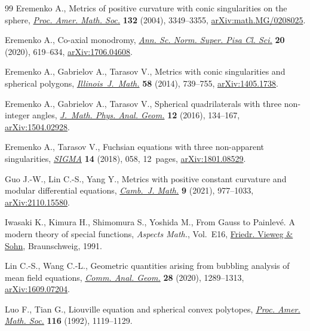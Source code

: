 \documentclass[pdftex]{sigma}
\numberwithin{equation}{section}
\begin{document}
\begin{thebibliography}{99}
Eremenko A., Metrics of positive curvature with conic singularities on the
 sphere, \href{https://doi.org/10.1090/S0002-9939-04-07439-8}{\textit{Proc. Amer. Math. Soc.}} \textbf{132} (2004), 3349--3355,
 \href{https://arxiv.org/abs/math.MG/0208025}{arXiv:math.MG/0208025}.

Eremenko A., Co-axial monodromy, \href{https://doi.org/10.2422/2036-2145.201706_022}{\textit{Ann. Sc. Norm. Super. Pisa Cl. Sci.}}
 \textbf{20} (2020), 619--634, \href{https://arxiv.org/abs/1706.04608}{arXiv:1706.04608}.

Eremenko A., Gabrielov A., Tarasov V., Metrics with conic singularities and
 spherical polygons, \href{https://doi.org/10.1215/ijm/1441790388}{\textit{Illinois~J.~Math.}} \textbf{58} (2014), 739--755,
 \href{https://arxiv.org/abs/1405.1738}{arXiv:1405.1738}.

Eremenko A., Gabrielov A., Tarasov V., Spherical quadrilaterals with three
 non-integer angles, \href{https://doi.org/10.15407/mag12.02.134}{\textit{J.~Math. Phys. Anal. Geom.}} \textbf{12} (2016),
 134--167, \href{https://arxiv.org/abs/1504.02928}{arXiv:1504.02928}.

Eremenko A., Tarasov V., Fuchsian equations with three non-apparent
 singularities, \href{https://doi.org/10.3842/SIGMA.2018.058}{\textit{SIGMA}} \textbf{14} (2018), 058, 12~pages,
 \href{https://arxiv.org/abs/1801.08529}{arXiv:1801.08529}.

Guo J.-W., Lin C.-S., Yang Y., Metrics with positive constant curvature and
 modular differential equations, \href{https://doi.org/10.4310/CJM.2021.v9.n4.a3}{\textit{Camb.~J. Math.}} \textbf{9} (2021),
 977--1033, \href{https://arxiv.org/abs/2110.15580}{arXiv:2110.15580}.

Iwasaki K., Kimura H., Shimomura S., Yoshida M., From {G}auss to {P}ainlev\'e.
 A modern theory of special functions, \textit{Aspects Math.}, Vol.~E16,
 \href{https://doi.org/10.1007/978-3-322-90163-7}{Friedr. Vieweg \& Sohn}, Braunschweig, 1991.

Lin C.-S., Wang C.-L., Geometric quantities arising from bubbling analysis of
 mean field equations, \href{https://doi.org/10.4310/CAG.2020.v28.n6.a2}{\textit{Comm. Anal. Geom.}} \textbf{28} (2020),
 1289--1313, \href{https://arxiv.org/abs/1609.07204}{arXiv:1609.07204}.

Luo F., Tian G., Liouville equation and spherical convex polytopes,
 \href{https://doi.org/10.2307/2159498}{\textit{Proc. Amer. Math. Soc.}} \textbf{116} (1992), 1119--1129.


\end{thebibliography}
\end{document}
